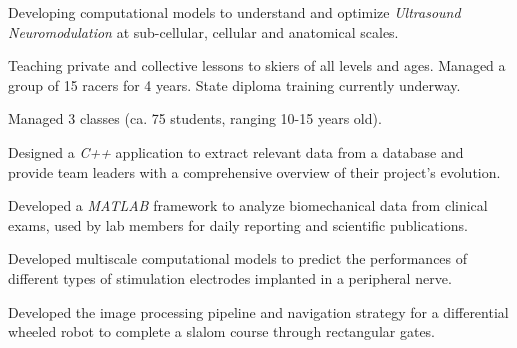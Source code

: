 \documentclass[a4paper]{cv}
\begin{document}
\begin{minipage}[t]{0.6\textwidth}

\experience

Developing computational models to understand and optimize \emph{Ultrasound Neuromodulation} at sub-cellular, cellular and anatomical scales.
\sectionspace

Teaching private and collective lessons to skiers of all levels and ages. Managed a group of 15 racers for 4 years. State diploma training currently underway.
\sectionspace

Managed 3 classes (ca. 75 students, ranging 10-15 years old).
\sectionspace

Designed a \emph{C++} application to extract relevant data from a database and provide team leaders with a comprehensive overview of their project's evolution.
\sectionspace

Developed a \emph{MATLAB} framework to analyze biomechanical data from clinical exams, used by lab members for daily reporting and scientific publications.\sectionspace

\projects

Developed multiscale computational models to predict the performances of different types of stimulation electrodes implanted in a peripheral nerve.
\sectionspace

Developed the image processing pipeline and navigation strategy for a differential wheeled robot to complete a slalom course through rectangular gates.
\sectionspace


\end{minipage}
\end{document}
